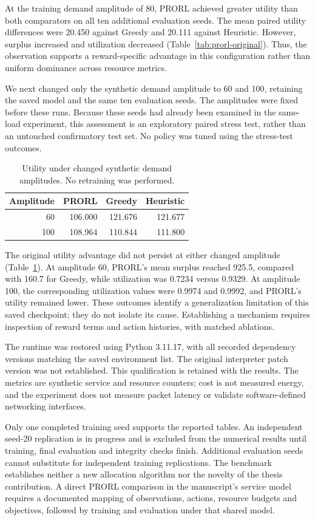 At the training demand amplitude of 80, PRORL achieved greater utility than
both comparators on all ten additional evaluation seeds. The mean paired
utility differences were 20.450 against Greedy and 20.111 against Heuristic.
However, surplus increased and utilization decreased
(Table~\ref{tab:prorl-original}). Thus, the observation supports a
reward-specific advantage in this configuration rather than uniform
dominance across resource metrics.

We next changed only the synthetic demand amplitude to 60 and 100, retaining
the saved model and the same ten evaluation seeds. The amplitudes were fixed
before these runs. Because these seeds had already been examined in the
same-load experiment, this assessment is an exploratory paired stress test,
rather than an untouched confirmatory test set. No policy was tuned using the
stress-test outcomes.

\begin{table}[t]
\centering
\caption{Utility under changed synthetic demand amplitudes. No retraining was
performed.}
\label{tab:prorl-shift}
\begin{tabular}{rrrr}
\hline
Amplitude & PRORL & Greedy & Heuristic\\
\hline
60 & 106.000 & 121.676 & 121.677\\
100 & 108.964 & 110.844 & 111.800\\
\hline
\end{tabular}
\end{table}

The original utility advantage did not persist at either changed amplitude
(Table~\ref{tab:prorl-shift}). At amplitude 60, PRORL's mean surplus reached
925.5, compared with 160.7 for Greedy, while utilization was 0.7234 versus
0.9329. At amplitude 100, the corresponding utilization values were 0.9974
and 0.9992, and PRORL's utility remained lower. These outcomes identify a
generalization limitation of this saved checkpoint; they do not isolate its
cause. Establishing a mechanism requires inspection of reward terms and
action histories, with matched ablations.

The runtime was restored using Python 3.11.17, with all recorded dependency
versions matching the saved environment list. The original interpreter patch
version was not established. This qualification is retained with the results.
The metrics are synthetic service and resource counters; cost is not measured
energy, and the experiment does not measure packet latency or validate
software-defined networking interfaces.

Only one completed training seed supports the reported tables. An independent
seed-20 replication is in progress and is excluded from the numerical results
until training, final evaluation and integrity checks finish. Additional
evaluation seeds cannot substitute for independent training replications.
The benchmark establishes neither a new allocation algorithm nor the novelty
of the thesis contribution. A direct PRORL comparison in the manuscript's
service model requires a documented mapping of observations, actions,
resource budgets and objectives, followed by training and evaluation under
that shared model.
